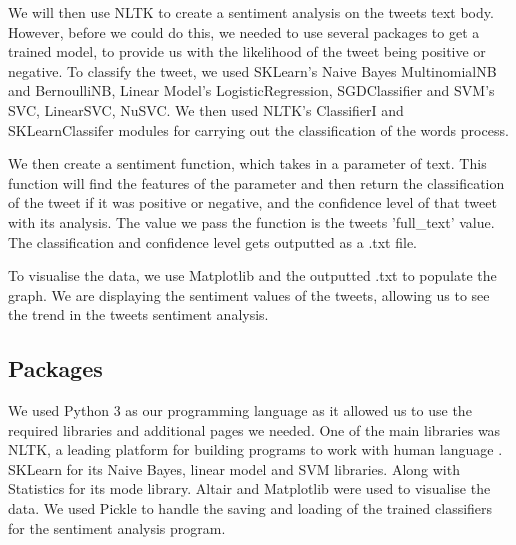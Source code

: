 \documentclass[a4paper,10pt]{article}
\begin{document}
	We will then use NLTK to create a sentiment analysis on the tweets text body. However, before we could do this, we needed to use several packages to get a trained model, to provide us with the likelihood of the tweet being positive or negative. To classify the tweet, we used SKLearn's Naive Bayes MultinomialNB and BernoulliNB, Linear Model's LogisticRegression, SGDClassifier and SVM's SVC, LinearSVC, NuSVC. We then used NLTK's ClassifierI and SKLearnClassifer modules for carrying out the classification of the words process. 
	
	We then create a sentiment function, which takes in a parameter of text. This function will find the features of the parameter and then return the classification of the tweet if it was positive or negative, and the confidence level of that tweet with its analysis. The value we pass the function is the tweets 'full\_text' value. The classification and confidence level gets outputted as a .txt file.
	
	
	To visualise the data, we use Matplotlib and the outputted .txt to populate the graph. We are displaying the sentiment values of the tweets, allowing us to see the trend in the tweets sentiment analysis. 
	
	
	\subsection{Packages}
	We used Python 3 \cite{Python} as our programming language as it allowed us to use the required libraries and additional pages we needed. One of the main libraries was NLTK, a leading platform for building programs to work with human language \cite{nltk}. SKLearn \cite{van2014scikit} for its Naive Bayes, linear model and SVM libraries. Along with Statistics for its mode library. Altair and Matplotlib \cite{hunter2007matplotlib} were used to visualise the data. We used Pickle \cite{Python} to handle the saving and loading of the trained classifiers for the sentiment analysis program. 
	
	
	
\end{document}

